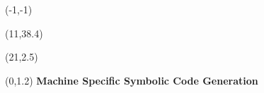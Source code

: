 \documentclass[landscape]{a0poster}
\def\Title#1{\noindent\textbf{{\VeryHuge\color{Red} #1}}}
\begin{document}

\begin{textblock}{20}(-1,-1) 
\end{textblock} 

\begin{textblock}{20}(11,38.4) 
\end{textblock} 

\begin{textblock}{2}(21,2.5) %
\end{textblock} %








\begin{textblock}{25}(0,1.2) %
	\Title{Machine Specific Symbolic Code Generation}
\end{textblock} %
\end{document}
